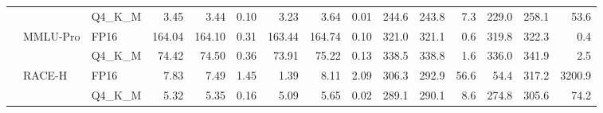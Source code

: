 \begin{table}[t]
{\begin{tabular}{lllrrrrrrrrrrrr}
 &  & Q4\_K\_M & 3.45 & 3.44 & 0.10 & 3.23 & 3.64 & 0.01 & 244.6 & 243.8 & 7.3 & 229.0 & 258.1 & 53.6 \\
 & MMLU-Pro & FP16 & 164.04 & 164.10 & 0.31 & 163.44 & 164.74 & 0.10 & 321.0 & 321.1 & 0.6 & 319.8 & 322.3 & 0.4 \\
 &  & Q4\_K\_M & 74.42 & 74.50 & 0.36 & 73.91 & 75.22 & 0.13 & 338.5 & 338.8 & 1.6 & 336.0 & 341.9 & 2.5 \\
 & RACE-H & FP16 & 7.83 & 7.49 & 1.45 & 1.39 & 8.11 & 2.09 & 306.3 & 292.9 & 56.6 & 54.4 & 317.2 & 3200.9 \\
 &  & Q4\_K\_M & 5.32 & 5.35 & 0.16 & 5.09 & 5.65 & 0.02 & 289.1 & 290.1 & 8.6 & 274.8 & 305.6 & 74.2 \\
\bottomrule
\end{tabular}
}
\end{table}
